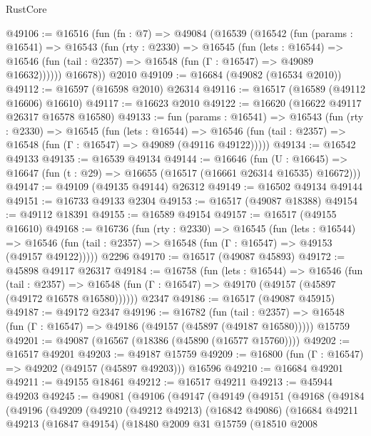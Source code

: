 \begin{lexlean}{RustCore}
\begin{coremodule}
@49106 := @16516
    (fun (fn : @7) =>
    @49084
      (@16539
        (@16542
          (fun (params : @16541) =>
          @16543
            (fun (rty : @2330) =>
            @16545
              (fun (lets : @16544) =>
              @16546 (fun (tail : @2357) => @16548 (fun (Γ : @16547) => @49089 @16632))))))
        @16678))
    @2010
@49109 := @16684 (@49082 (@16534 @2010))
@49112 := @16597 (@16598 @2010) @26314
@49116 := @16517 (@16589 (@49112 @16606) @16610)
@49117 := @16623 @2010
@49122 := @16620 (@16622 @49117 @26317 @16578 @16580)
@49133 := fun (params : @16541) =>
  @16543
    (fun (rty : @2330) =>
    @16545
      (fun (lets : @16544) =>
      @16546 (fun (tail : @2357) => @16548 (fun (Γ : @16547) => @49089 (@49116 @49122)))))
@49134 := @16542 @49133
@49135 := @16539 @49134
@49144 := @16646
    (fun (U : @16645) => @16647 (fun (t : @29) => @16655 (@16517 (@16661 @26314 @16535) @16672)))
@49147 := @49109 (@49135 @49144) @26312
@49149 := @16502 @49134 @49144
@49151 := @16733 @49133 @2304
@49153 := @16517 (@49087 @18388)
@49154 := @49112 @18391
@49155 := @16589 @49154
@49157 := @16517 (@49155 @16610)
@49168 := @16736
    (fun (rty : @2330) =>
    @16545
      (fun (lets : @16544) =>
      @16546 (fun (tail : @2357) => @16548 (fun (Γ : @16547) => @49153 (@49157 @49122)))))
    @2296
@49170 := @16517 (@49087 @45893)
@49172 := @45898 @49117 @26317
@49184 := @16758
    (fun (lets : @16544) =>
    @16546
      (fun (tail : @2357) =>
      @16548 (fun (Γ : @16547) => @49170 (@49157 (@45897 (@49172 @16578 @16580))))))
    @2347
@49186 := @16517 (@49087 @45915)
@49187 := @49172 @2347
@49196 := @16782
    (fun (tail : @2357) => @16548 (fun (Γ : @16547) => @49186 (@49157 (@45897 (@49187 @16580)))))
    @15759
@49201 := @49087 (@16567 (@18386 (@45890 (@16577 @15760))))
@49202 := @16517 @49201
@49203 := @49187 @15759
@49209 := @16800 (fun (Γ : @16547) => @49202 (@49157 (@45897 @49203))) @16596
@49210 := @16684 @49201
@49211 := @49155 @18461
@49212 := @16517 @49211
@49213 := @45944 @49203
@49245 := @49081
    (@49106
      (@49147
        (@49149
          (@49151
            (@49168
              (@49184
                (@49196
                  (@49209
                    (@49210
                      (@49212 @49213)
                      (@16842 @49086)
                      (@16684
                        @49211
                        @49213
                        (@16847 @49154)
                        (@18480
                          @2009
                          @31
                          @15759
                          (@18510
                            @2008

\end{coremodule}
\end{lexlean}
